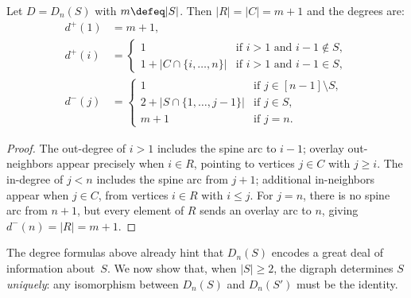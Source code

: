 \begin{proposition}\label{prop:degrees}
Let $D = D_n(S)$ with $m \defeq |S|$. Then $|R| = |C| = m + 1$ and the
degrees are:
\begin{align*}
d^{+}(1) &= m + 1, \\
d^{+}(i) &= \begin{cases}
  1 & \text{if } i > 1 \text{ and } i - 1 \notin S, \\
  1 + |C \cap \{i, \dots, n\}| & \text{if } i > 1 \text{ and } i - 1 \in S,
\end{cases} \\[1ex]
d^{-}(j) &= \begin{cases}
  1 & \text{if } j \in [n{-}1] \setminus S, \\
  2 + |S \cap \{1, \dots, j{-}1\}| & \text{if } j \in S, \\
  m + 1 & \text{if } j = n.
\end{cases}
\end{align*}
\end{proposition}
\begin{proof}
The out-degree of $i > 1$ includes the spine arc to $i - 1$; overlay
out-neighbors appear precisely when $i \in R$, pointing to vertices
$j \in C$ with $j \ge i$. The in-degree of $j < n$ includes the spine arc
from $j + 1$; additional in-neighbors appear when $j \in C$, from vertices
$i \in R$ with $i \le j$. For $j = n$, there is no spine arc from $n + 1$,
but every element of $R$ sends an overlay arc to $n$, giving
$d^{-}(n) = |R| = m + 1$.
\end{proof}


The degree formulas above already hint that $D_n(S)$ encodes a great deal of
information about~$S$. We now show that, when $|S| \ge 2$, the digraph
determines $S$ \emph{uniquely}: any isomorphism between $D_n(S)$ and $D_n(S')$
must be the identity.

